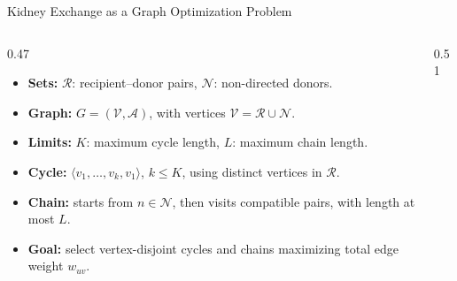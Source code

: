 \documentclass[aspectratio=169]{beamer}
\newcommand{\V}{\mathcal{V}}
\newcommand{\A}{\mathcal{A}}
\begin{document}
\begin{frame}{Kidney Exchange as a Graph Optimization Problem}
  \footnotesize
  \begin{columns}[T,onlytextwidth]
    \begin{column}{0.47\textwidth}
      \begin{itemize}
        \item \textbf{Sets:}
        \(\mathcal{R}\): recipient--donor pairs,
        \(\mathcal{N}\): non-directed donors.

        \item \textbf{Graph:}
        \(G=(\V,\A)\), with vertices
        \(\V=\mathcal{R}\cup\mathcal{N}\).

        \item \textbf{Limits:}
        \(K\): maximum cycle length,
        \(L\): maximum chain length.

        \item \textbf{Cycle:}
        \(\langle v_1,\dots,v_k,v_1\rangle\),
        \(k\le K\), using distinct vertices in \(\mathcal{R}\).

        \item \textbf{Chain:}
        starts from \(n\in\mathcal{N}\), then visits compatible pairs,
        with length at most \(L\).

        \item \textbf{Goal:}
        select vertex-disjoint cycles and chains maximizing total edge weight \(w_{uv}\).
      \end{itemize}
    \end{column}
    \begin{column}{0.51\textwidth}
      \centering
    \end{column}
  \end{columns}
\end{frame}
\end{document}

